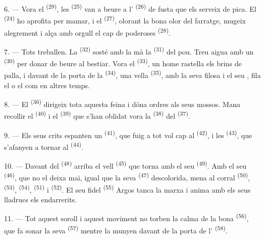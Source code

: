 6. --- Vora el  \textsuperscript{(29)}, les  \textsuperscript{(25)}
van a beure a l' \textsuperscript{(26)} de fusta que els serveix de pica. El
 \textsuperscript{(24)} ho aprofita per mamar, i el 
\textsuperscript{(27)}, olorant la bona olor del farratge, mugeix alegrement i alça amb orgull
el cap de poderoses
 \textsuperscript{(28)}.

7. --- Tots treballen. La  \textsuperscript{(32)} sosté amb la mà la
 \textsuperscript{(31)} del pou. Treu aigua amb un 
\textsuperscript{(30)} per donar de beure al bestiar. Vora el 
\textsuperscript{(33)}, un home rastella els brins de palla, i davant de la porta de la
 \textsuperscript{(34)}, una vella  \textsuperscript{(35)}, amb
la seva filosa i el seu , fila el
 o el  com en altres temps.

\VUsaut{3.0mm}
\VUsaut{3.0mm}

8. --- El  \textsuperscript{(36)} dirigeix tota aquesta feina i dóna ordres als
seus mossos. Mana recollir el  \textsuperscript{(40)} i el 
\textsuperscript{(39)} que s'han oblidat vora la  \textsuperscript{(38)} del
 \textsuperscript{(37)}.

9. --- Els seus crits espanten un  \textsuperscript{(41)}, que fuig a tot vol
cap al  \textsuperscript{(42)}, i les 
\textsuperscript{(43)}, que s'afanyen a tornar al  \textsuperscript{(44)}.

10. --- Davant del  \textsuperscript{(48)} arriba el vell
 \textsuperscript{(45)} que torna amb el seu 
\textsuperscript{(49)}. Amb el seu  \textsuperscript{(46)}, que no el deixa
mai, igual que la seva  \textsuperscript{(47)} descolorida, mena al corral
 \textsuperscript{(50)},  \textsuperscript{(53)},
 \textsuperscript{(54)},
 \textsuperscript{(51)} i 
\textsuperscript{(52)}. El seu fidel  \textsuperscript{(55)} Argos tanca la marxa
i anima amb els seus lladrucs els endarrerits.

11. --- Tot aquest soroll i aquest moviment no torben la calma de la bona
 \textsuperscript{(56)}, que fa sonar la seva 
\textsuperscript{(57)} mentre la munyen davant de la porta de l'
\textsuperscript{(58)}.


